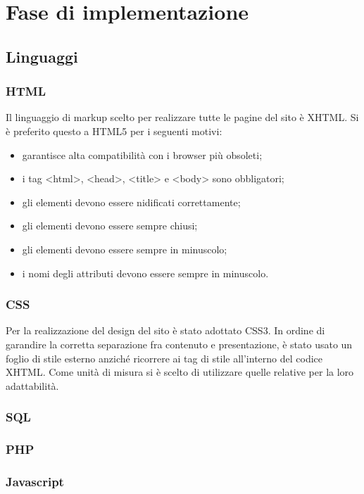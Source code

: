 \section{Fase di implementazione}
\subsection{Linguaggi}
\subsubsection{HTML}
Il linguaggio di markup scelto per realizzare tutte le pagine del sito è XHTML. Si è preferito questo a HTML5 per i seguenti motivi:
\begin{itemize}
    \item garantisce alta compatibilità con i browser più obsoleti;
    \item i tag <html>, <head>, <title> e <body> sono obbligatori;
	\item gli elementi devono essere nidificati correttamente;
	\item gli elementi devono essere sempre chiusi;
	\item gli elementi devono essere sempre in minuscolo;
	\item i nomi degli attributi devono essere sempre in minuscolo.
\end{itemize}
\subsubsection{CSS}
Per la realizzazione del design del sito è stato adottato CSS3. In ordine di garandire la corretta separazione fra contenuto e presentazione, è stato usato un foglio di stile esterno anziché ricorrere ai tag di stile all'interno del codice XHTML. Come unità di misura si è scelto di utilizzare quelle relative per la loro adattabilità.
\subsubsection{SQL}
\subsubsection{PHP}
\subsubsection{Javascript}
